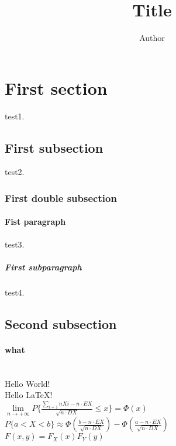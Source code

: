 \documentclass{article}
\author {Author}
\title {Title}
\begin{document}
\maketitle
\section{First section} test1.
    \subsection{First subsection} test2.
        \subsubsection{First double subsection}
            \paragraph{Fist paragraph} test3.
                \subparagraph{First subparagraph} test4.
    \subsection{Second subsection}
        \paragraph{what}
\\
Hello World! \\ %
Hello \LaTeX ! \\

$\lim\limits_{n \rightarrow +\infty} P\lbrace\frac{\sum\limits_{i=1}{n}Xi - n\cdot EX}{ \sqrt{n \cdot DX} }  \leqslant x\rbrace = \Phi(x)$ \\

$P\lbrace a<X<b \rbrace \approx \Phi(\frac{b - n\cdot EX}{\sqrt {n\cdot DX}}) - \Phi(\frac{a - n\cdot EX}{\sqrt{n\cdot DX} })$ \\

$F(x,y) = F_{X}(x)F_{Y}(y)$
\end{document}
